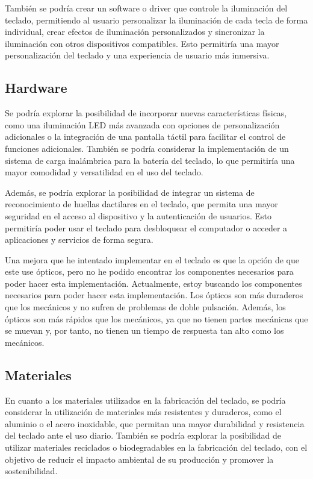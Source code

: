 También se podría crear un software o driver que controle la iluminación del teclado, permitiendo al usuario personalizar la iluminación de cada tecla de forma individual, crear efectos de iluminación personalizados y sincronizar la iluminación con otros dispositivos compatibles. Esto permitiría una mayor personalización del teclado y una experiencia de usuario más inmersiva.

\subsection{Hardware}
Se podría explorar la posibilidad de incorporar nuevas características físicas, como una iluminación LED más avanzada con opciones de personalización adicionales o la integración de una pantalla táctil para facilitar el control de funciones adicionales. También se podría considerar la implementación de un sistema de carga inalámbrica para la batería del teclado, lo que permitiría una mayor comodidad y versatilidad en el uso del teclado.

Además, se podría explorar la posibilidad de integrar un sistema de reconocimiento de huellas dactilares en el teclado, que permita una mayor seguridad en el acceso al dispositivo y la autenticación de usuarios. Esto permitiría poder usar el teclado para desbloquear el computador o acceder a aplicaciones y servicios de forma segura.

Una mejora que he intentado implementar en el teclado es que la opción de que este use  ópticos, pero no he podido encontrar los componentes necesarios para poder hacer esta implementación. Actualmente, estoy buscando los componentes necesarios para poder hacer esta implementación. Los  ópticos son más duraderos que los  mecánicos y no sufren de problemas de doble pulsación. Además, los  ópticos son más rápidos que los  mecánicos, ya que no tienen partes mecánicas que se muevan y, por tanto, no tienen un tiempo de respuesta tan alto como los  mecánicos.

\subsection{Materiales}
En cuanto a los materiales utilizados en la fabricación del teclado, se podría considerar la utilización de materiales más resistentes y duraderos, como el aluminio o el acero inoxidable, que permitan una mayor durabilidad y resistencia del teclado ante el uso diario. También se podría explorar la posibilidad de utilizar materiales reciclados o biodegradables en la fabricación del teclado, con el objetivo de reducir el impacto ambiental de su producción y promover la sostenibilidad.

